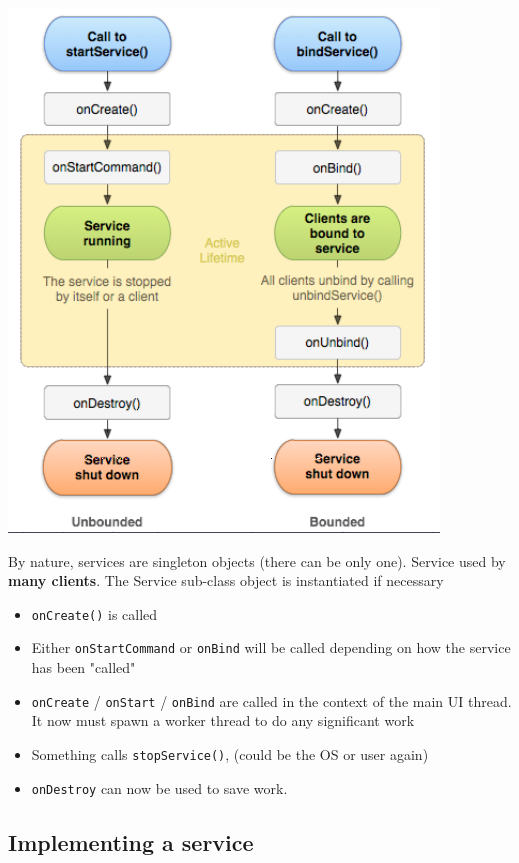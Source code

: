 \documentclass{article}
\begin{document}
\begin{center}
  \includegraphics[scale=0.8]{threads.png}
\end{center}

By nature, services are singleton objects (there can be only one). Service used by \textbf{many clients}. The Service sub-class object is instantiated if necessary
\begin{itemize}
  \item \texttt{onCreate()} is called
  \item Either \texttt{onStartCommand} or \texttt{onBind} will be called depending on how the service has been "called"
  \item \texttt{onCreate} / \texttt{onStart} / \texttt{onBind} are called in the context of the main UI thread. It now must spawn a worker thread to do any significant work
  \item Something calls \texttt{stopService()}, (could be the OS or user again)
  \item \texttt{onDestroy} can now be used to save work.
\end{itemize}

\subsection{Implementing a service}
\end{document}
